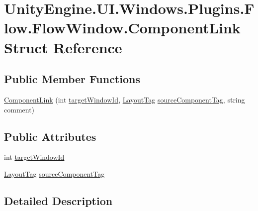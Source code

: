 \hypertarget{struct_unity_engine_1_1_u_i_1_1_windows_1_1_plugins_1_1_flow_1_1_flow_window_1_1_component_link}{}\section{Unity\+Engine.\+U\+I.\+Windows.\+Plugins.\+Flow.\+Flow\+Window.\+Component\+Link Struct Reference}
\label{struct_unity_engine_1_1_u_i_1_1_windows_1_1_plugins_1_1_flow_1_1_flow_window_1_1_component_link}
\subsection*{Public Member Functions}
\begin{DoxyCompactItemize}
\item 
\hyperlink{struct_unity_engine_1_1_u_i_1_1_windows_1_1_plugins_1_1_flow_1_1_flow_window_1_1_component_link_af74bc3d754874dc37f834cbe2c3316b8}{Component\+Link} (int \hyperlink{struct_unity_engine_1_1_u_i_1_1_windows_1_1_plugins_1_1_flow_1_1_flow_window_1_1_component_link_a6c6892eee3f4494f907240b19b07430e}{target\+Window\+Id}, \hyperlink{namespace_unity_engine_1_1_u_i_1_1_windows_a954ff5db0de6295464f3b95598158333}{Layout\+Tag} \hyperlink{struct_unity_engine_1_1_u_i_1_1_windows_1_1_plugins_1_1_flow_1_1_flow_window_1_1_component_link_a588dcfaf5fb56f0cc997c45d474aab70}{source\+Component\+Tag}, string comment)
\end{DoxyCompactItemize}
\subsection*{Public Attributes}
\begin{DoxyCompactItemize}
\item 
int \hyperlink{struct_unity_engine_1_1_u_i_1_1_windows_1_1_plugins_1_1_flow_1_1_flow_window_1_1_component_link_a6c6892eee3f4494f907240b19b07430e}{target\+Window\+Id}
\item 
\hyperlink{namespace_unity_engine_1_1_u_i_1_1_windows_a954ff5db0de6295464f3b95598158333}{Layout\+Tag} \hyperlink{struct_unity_engine_1_1_u_i_1_1_windows_1_1_plugins_1_1_flow_1_1_flow_window_1_1_component_link_a588dcfaf5fb56f0cc997c45d474aab70}{source\+Component\+Tag}
\end{DoxyCompactItemize}


\subsection{Detailed Description}



